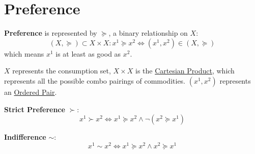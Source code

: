 \section{Preference}
\begin{definition}[Preference]
    \textbf{Preference} is represented by $\succeq$, a binary relationship on $X$: \[
        (X, \succeq) \subset X \times X: x^{1} \succeq x^{2} \iff(x^{1}, x^{2}) \in (X, \succeq)
    \] which means $x^{1}$ is at least as good as $x^{2}$.
    \begin{remark*}
        $X$ represents the consumption set, $X \times X$ is the \underline{Cartesian Product}, which represents all the possible combo pairings of commodities. $(x^{1}, x^{2})$ represents an \underline{Ordered Pair}.
    \end{remark*}

    \textbf{Strict Preference} $\succ$: \[
        x^{1} \succ x^{2} \iff x^{1} \succeq x^{2} \wedge \neg(x^{2} \succeq x^{1})
    \]

    \textbf{Indifference} $\sim$: \[
        x^{1} \sim x^{2} \iff x^{1} \succeq x^{2} \wedge x^{2} \succeq x^{1}
    \]
\end{definition}

